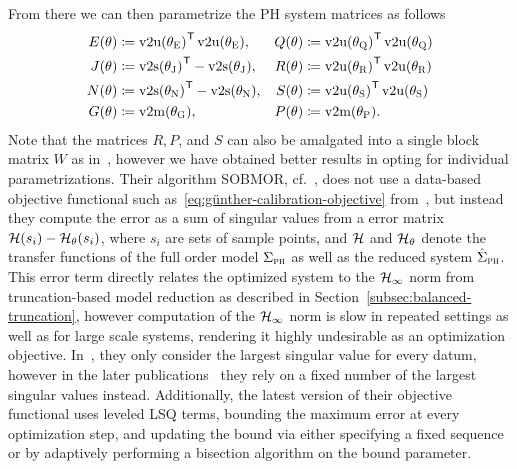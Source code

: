 From there we can then parametrize the \ac{PH} system matrices as follows
\begin{equation}\label{eq:sobmor-parametrization}
    \begin{alignedat}{3}
        E(\theta) &\coloneqq {\vecupper(\theta_\msc{E})}\trans \vecupper(\theta_\msc{E}),\quad &Q(\theta) &\coloneqq {\vecupper(\theta_\msc{Q})}\trans \vecupper(\theta_\msc{Q}) \\
        J(\theta) &\coloneqq {\vecstrict(\theta_\msc{J})}\trans - \vecstrict(\theta_\msc{J}),\quad &R(\theta) &\coloneqq {\vecupper(\theta_\msc{R})}\trans \vecupper(\theta_\msc{R}) \\
        N(\theta) &\coloneqq {\vecstrict(\theta_\msc{N})}\trans - \vecstrict(\theta_\msc{N}),\quad &S(\theta) &\coloneqq {\vecupper(\theta_\msc{S})}\trans \vecupper(\theta_\msc{S}) \\
        G(\theta) &\coloneqq \vecmat(\theta_\msc{G}),\quad &P(\theta) &\coloneqq \vecmat(\theta_\msc{P}).
    \end{alignedat}
\end{equation}
Note that the matrices $R, P$, and $S$ can also be amalgated into a single block matrix $W$ as in~\cite{Schwerdtner2021}, however we have obtained better results in opting for individual parametrizations.
Their algorithm \ac{SOBMOR}, cf.~\cite{Schwerdtner2023}, does not use a data-based objective functional such as~\eqref{eq:günther-calibration-objective} from~\cite{Günther2023}, but instead they compute the error as a sum of singular values from a error matrix $\mathcal{H}(s_i) - \mathcal{H}_\theta(s_i)$, where $s_i$ are sets of sample points, and $\mathcal{H}$ and $\mathcal{H}_\theta$ denote the transfer functions of the full order model $\Sigma_{\textnormal{\scshape ph}}$ as well as the reduced system $\hat{\Sigma}_{\textnormal{\scshape ph}}$.
This error term directly relates the optimized system to the $\mathcal{H}_\infty$ norm from truncation-based model reduction as described in Section~\ref{subsec:balanced-truncation}, however computation of the $\mathcal{H}_\infty$ norm is slow in repeated settings as well as for large scale systems, rendering it highly undesirable as an optimization objective.
In~\cite{Schwerdtner2021, SV2021}, they only consider the largest singular value for every datum, however in the later publications~\cite{Schwerdtner2022, Schwerdtner2023} they rely on a fixed number of the largest singular values instead.
Additionally, the latest version of their objective functional uses leveled \ac{LSQ} terms, bounding the maximum error at every optimization step, and updating the bound via either specifying a fixed sequence or by adaptively performing a bisection algorithm on the bound parameter.

